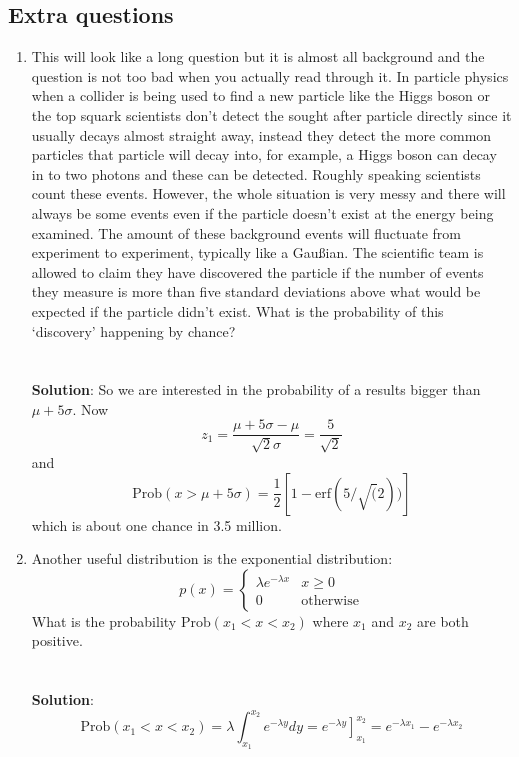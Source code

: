 \documentclass[11pt,a4paper]{scrartcl}
\begin{document}
\subsection*{Extra questions}

\begin{enumerate}

  
\item This will look like a long question but it is almost all
  background and the question is not too bad when you actually read
  through it. In particle physics when a collider is being used to
  find a new particle like the Higgs boson or the top squark
  scientists don't detect the sought after particle directly since it
  usually decays almost straight away, instead they detect the more
  common particles that particle will decay into, for example, a Higgs
  boson can decay in to two photons and these can be detected. Roughly
  speaking scientists count these events. However, the whole situation
  is very messy and there will always be some events even if the
  particle doesn't exist at the energy being examined. The amount of
  these background events will fluctuate from experiment to
  experiment, typically like a Gau\ss{}ian. The scientific team is
  allowed to claim they have discovered the particle if the number of
  events they measure is more than five standard deviations above
  what would be expected if the particle didn't exist. What is the
  probability of this \lq{}discovery\rq{} happening by chance?
  \\ \\ \\ \textbf{Solution}: So we are interested in the probability of a results bigger than $\mu+5\sigma$. Now
\begin{equation}
z_1=\frac{\mu+5\sigma-\mu}{\sqrt{2}\sigma}=\frac{5}{\sqrt{2}}
\end{equation}
and
\begin{equation}
\mbox{Prob}(x>\mu+5\sigma)=\frac{1}{2}[1-\mbox{erf}(5/\sqrt(2))]
\end{equation}
which is about one chance in 3.5 million.

\item Another useful distribution is the exponential distribution:
$$
p(x)=\left\{\begin{array}{cc}\lambda e^{-\lambda x}& x\ge 0\\ 0&\mbox{otherwise}\end{array}\right.
$$
What is the probability $\mbox{Prob}(x_1 < x <x_2)$ where $x_1$ and $x_2$ are both positive.
  \\ \\ \\ \textbf{Solution}: 
\begin{equation}
\mbox{Prob}(x_1 < x <x_2)=\lambda \int_{x_1}^{x_2} e^{-\lambda y}dy=\left. e^{-\lambda y} \right]_{x_1}^{x_2}=e^{-\lambda x_1}-e^{-\lambda x_2}
\end{equation}


\end{enumerate}
\end{document}
